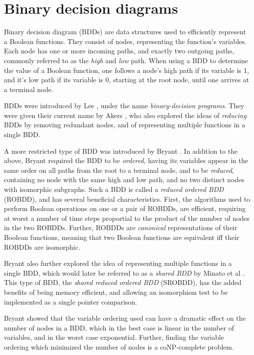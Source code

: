 \documentclass[a4paper,11pt]{kth-mag}
\begin{document}
\cite{crick_thesis}

\section{Binary decision diagrams}

Binary decision diagram (BDDs) are data structures used to efficiently represent a Boolean functions.
They consist of nodes, representing the function's variables. Each node has one or more incoming paths, and exactly two outgoing paths, commonly referred to as the \emph{high} and \emph{low} path.
When using a BDD to determine the value of a Boolean function, one follows a node's high path if its variable is 1, and it's low path if its variable is 0, starting at the root node, until one arrives at a terminal node.

BDDs were introduced by Lee \cite{lee59}, under the name \emph{binary-decision programs}.
They were given their current name by Akers \cite{akers78}, who also explored the ideas of \emph{reducing} BDDs by removing redundant nodes, and of representing multiple functions in a single BDD.

A more restricted type of BDD was introduced by Bryant \cite{bryant86}.
In addition to the above, Bryant required the BDD to be \emph{ordered}, having its variables appear in the same order on all paths from the root to a terminal node,
and to be \emph{reduced}, containing no node with the same high and low path, and no two distinct nodes with isomorphic subgraphs.
Such a BDD is called a \emph{reduced ordered BDD} (ROBDD), and has several beneficial characteristics.
First, the algorithms used to perform Boolean operations on one or a pair of ROBDDs, are efficient, requiring at worst a number of time steps proportial to the product of the number of nodes in the two ROBDDs.
Further, ROBDDs are \emph{canonical} representations of their Boolean functions, meaning that two Boolean functions are equivalent iff their ROBDDs are isomorphic.

Bryant also further explored the idea of representing multiple functions in a single BDD, which would later be referred to as a \emph{shared BDD} by Minato et al \cite{minato90}.
This type of BDD, the \emph{shared reduced ordered BDD} (SROBDD), has the added benefits of being memory efficient, and allowing an isomorphism test to be implemented as a single pointer comparison.

Bryant showed that the variable ordering used can have a dramatic effect on the number of nodes in a BDD, which in the best case is linear in the number of variables, and in the worst case exponential.
Further, finding the variable ordering which minimized the number of nodes is a coNP-complete problem. %
\end{document}
